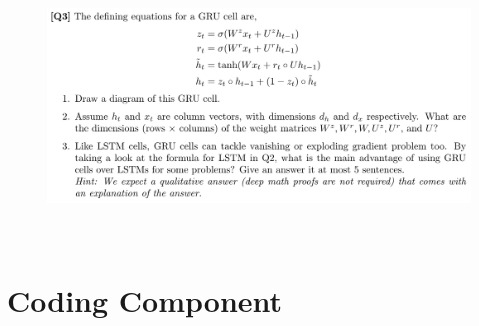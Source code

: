 \documentclass[12pt]{article}
\newenvironment{solution}[2][Solution]{\begin{trivlist}
\item[\hskip \labelsep {\bfseries #1}]}{\end{trivlist}}
\begin{document}
\begin{solution}{}~
\end{solution}

\begin{figure}[h!]
\includegraphics[width=\linewidth]{./assets/201606300429.png}
\end{figure}

\begin{solution}{}~
\end{solution}

\section{Coding Component}


\end{document}
